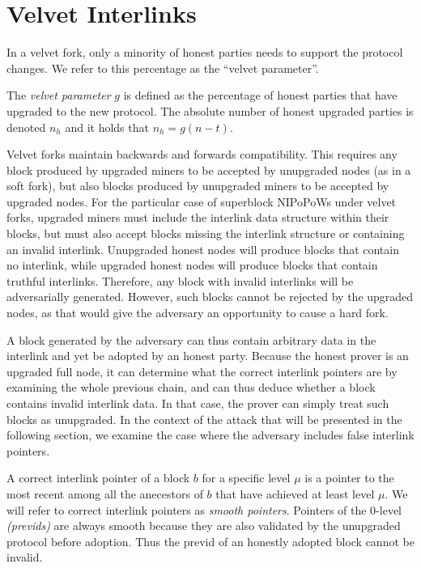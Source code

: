 \section{Velvet Interlinks}
In a velvet fork, only a minority of honest parties needs to support the protocol
changes. We refer to this percentage as the ``velvet parameter''.

\begin{definition}
	The \emph{velvet parameter} $g$ is defined as the percentage of honest parties
	that have upgraded to the new protocol. The absolute number of honest upgraded
	parties is denoted $n_h$ and it holds that
	$n_h = g (n - t)$.
	\label{defn:velvet_honest_majority}
\end{definition}

Velvet forks maintain backwards and forwards compatibility. This requires any block produced by upgraded miners to be accepted by unupgraded nodes (as in a soft fork), but also blocks produced by unupgraded miners to be accepted by upgraded nodes. For the particular case of superblock NIPoPoWs under velvet forks, upgraded miners must include the interlink data structure within their blocks, but must also accept blocks missing the interlink structure or containing an invalid interlink. Unupgraded honest nodes will produce blocks that contain no interlink, while upgraded honest nodes will produce blocks that contain truthful interlinks. Therefore, any block with invalid interlinks will be adversarially generated. However, such blocks cannot be rejected by the upgraded nodes, as that would give the adversary an opportunity to cause a hard fork.

A block generated by the adversary can thus contain arbitrary data in the interlink and yet be adopted by an honest party. Because the honest prover is an upgraded full node, it can determine what the correct interlink pointers are by examining the whole previous chain, and can thus deduce whether a block contains invalid interlink data. In that case, the prover can simply treat such blocks as unupgraded. In the context of the attack that will be presented in the following section, we examine the case where the adversary includes false interlink pointers.

A correct interlink pointer of a block $b$ for a specific level $\mu$ is a pointer to the most recent among all the anecestors of $b$ that have achieved at least level $\mu$. We will refer to correct interlink pointers as \emph{smooth pointers}. Pointers of the 0-level \textit{(previds)} are always smooth because they are also validated by the unupgraded protocol before adoption. Thus the previd of an
honestly adopted block cannot be invalid.


